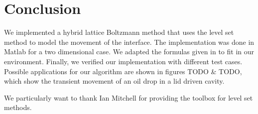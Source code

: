 \documentclass[final,leqno,onefignum,onetabnum]{siamltexmm}
\begin{document}
\section{Conclusion}
We implemented a hybrid lattice Boltzmann method that uses the level set method to model the movement of the interface. The implementation was done in Matlab for a two dimensional case. We adapted the formulas given in \cite{Thoemmes} to fit in our environment. Finally, we verified our implementation with different test cases.
Possible applications for our algorithm are shown in figures TODO \& TODO, which show the transient movement of an oil drop in a lid driven cavity. %

We particularly want to thank Ian Mitchell for providing the toolbox for level set methods.

\end{document}

